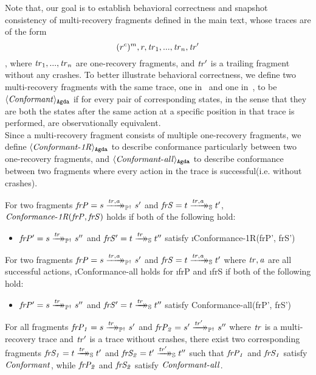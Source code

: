 Note that, our goal is to establish behavioral correctness and snapshot consistency of multi-recovery fragments defined in the main text, whose traces are of the form $$(r^c)^m, r, \mathit{tr}_1,...,\mathit{tr}_n,\mathit{tr'}$$, where $\mathit{tr}_1,...,\mathit{tr}_n$ are one-recovery fragments, and $\mathit{tr'}$ is a trailing fragment without any crashes.
To better illustrate behavioral correctness, we define two multi-recovery fragments with the same trace, one in \Prog\ and one in~\Spec, to be $\langle \mathit{Conformant} \rangle_\mathtt{Agda}$ if for every pair of corresponding states, in the sense that they are both the states after the same action at a specific position in that trace is performed, are observationally equivalent.\\
Since a multi-recovery fragment consists of multiple one-recovery fragments, we define $\langle \mathit{Conformant{\text-}1R} \rangle_\mathtt{Agda}$ to describe conformance particularly between two one-recovery fragments, and $\langle \mathit{Conformant{\text-}all} \rangle_\mathtt{Agda}$ to describe conformance between two fragments where every action in the trace is successful(i.e. without crashes).\\
\begin{definition}
    For two fragments $\mathit{frP} = s \xrightarrow{\mathit{tr, a}}\mathrel{\mkern-14mu}\rightarrow_{\mathbb P^\dagger} s'$ and $\mathit{frS} = t \xrightarrow{\mathit{tr, a}}\mathrel{\mkern-14mu}\rightarrow_{\mathbb S} t'$, $\mathit{Conformance{\text-}1R}(\mathit{frP}, \mathit{frS})$ holds if both of the following hold:
    \begin{itemize}
        \item $\mathit{frP'} = s \xrightarrow{\mathit{tr}}\mathrel{\mkern-14mu}\rightarrow_{\mathbb P^\dagger} s''$ and $\mathit{frS'} = t \xrightarrow{\mathit{tr}}\mathrel{\mkern-14mu}\rightarrow_{\mathbb S} t''$ satisfy \i{Conformance{\text-}1R(frP', frS')}
    \end{itemize}
\end{definition}

\begin{definition}
    For two fragments $\mathit{frP} = s \xrightarrow{\mathit{tr, a}}\mathrel{\mkern-14mu}\rightarrow_{\mathbb P^\dagger} s'$ and $\mathit{frS} = t \xrightarrow{\mathit{tr, a}}\mathrel{\mkern-14mu}\rightarrow_{\mathbb S} t'$ where $\mathit{tr, a}$ are all successful actions, \i{Conformance{\text-}all} holds for \i{frP} and \i{frS} if both of the following hold:
    \begin{itemize}
        \item $\mathit{frP'} = s \xrightarrow{\mathit{tr}}\mathrel{\mkern-14mu}\rightarrow_{\mathbb P^\dagger} s''$ and $\mathit{frS'} = t \xrightarrow{\mathit{tr}}\mathrel{\mkern-14mu}\rightarrow_{\mathbb S} t''$ satisfy Conformance{\text-}all(frP', frS')

    \end{itemize}
\end{definition}

\begin{theorem}   
For all fragments $\mathit{frP_1} = s \xrightarrow{\mathit{tr}}\mathrel{\mkern-14mu}\rightarrow_{\mathbb P^\dagger} s'$ and $\mathit{frP_2} = s' \xrightarrow{\mathit{tr'}}\mathrel{\mkern-14mu}\rightarrow_{\mathbb P^\dagger} s''$ where $\mathit{tr}$ is a multi-recovery trace and $\mathit{tr'}$ is a trace without crashes, there exist two corresponding fragments $\mathit{frS_1} = t \xrightarrow{\mathit{tr}}\mathrel{\mkern-14mu}\rightarrow_{\mathbb S} t'$ and $\mathit{frS_2} = t' \xrightarrow{\mathit{tr'}}\mathrel{\mkern-14mu}\rightarrow_{\mathbb S} t''$ such that $\mathit{frP_1}$ and $\mathit{frS_1}$ satisfy $\mathit{Conformant}$, while $\mathit{frP_2}$ and $\mathit{frS_2}$ satisfy $\mathit{Conformant{\text-}all}$. 
\end{theorem}